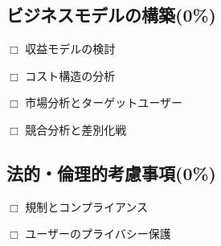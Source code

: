   \subsection{ビジネスモデルの構築(0\%)}
    \label{sec:ビジネスモデルの構築}
      \par $\Box$ 収益モデルの検討
      \par $\Box$ コスト構造の分析
      \par $\Box$ 市場分析とターゲットユーザー
      \par $\Box$ 競合分析と差別化戦
      
  \subsection{法的・倫理的考慮事項(0\%)}
    \label{sec:法的・倫理的考慮事項}
      \par $\Box$ 規制とコンプライアンス
      \par $\Box$ ユーザーのプライバシー保護
